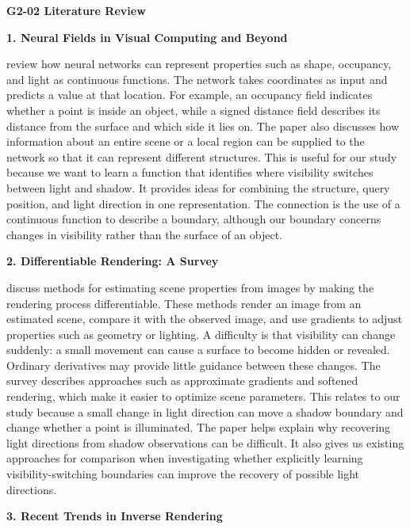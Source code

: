 \documentclass[11pt,letterpaper]{article}
\newcommand{\reviewtitle}[1]{\par\Needspace{10\baselineskip}\vspace{7pt}\textbf{#1}\par}
\begin{document}
\begin{center}
    {\Large\bfseries G2-02 Literature Review}
\end{center}

\reviewtitle{1. Neural Fields in Visual Computing and Beyond}

\citet{xie2022neuralfields} review how neural networks can represent properties such as shape, occupancy, and light as continuous functions. The network takes coordinates as input and predicts a value at that location. For example, an occupancy field indicates whether a point is inside an object, while a signed distance field describes its distance from the surface and which side it lies on. The paper also discusses how information about an entire scene or a local region can be supplied to the network so that it can represent different structures. This is useful for our study because we want to learn a function that identifies where visibility switches between light and shadow. It provides ideas for combining the structure, query position, and light direction in one representation. The connection is the use of a continuous function to describe a boundary, although our boundary concerns changes in visibility rather than the surface of an object.

\reviewtitle{2. Differentiable Rendering: A Survey}

\citet{kato2020differentiablerendering} discuss methods for estimating scene properties from images by making the rendering process differentiable. These methods render an image from an estimated scene, compare it with the observed image, and use gradients to adjust properties such as geometry or lighting. A difficulty is that visibility can change suddenly: a small movement can cause a surface to become hidden or revealed. Ordinary derivatives may provide little guidance between these changes. The survey describes approaches such as approximate gradients and softened rendering, which make it easier to optimize scene parameters. This relates to our study because a small change in light direction can move a shadow boundary and change whether a point is illuminated. The paper helps explain why recovering light directions from shadow observations can be difficult. It also gives us existing approaches for comparison when investigating whether explicitly learning visibility-switching boundaries can improve the recovery of possible light directions.

\reviewtitle{3. Recent Trends in Inverse Rendering}
\end{document}
